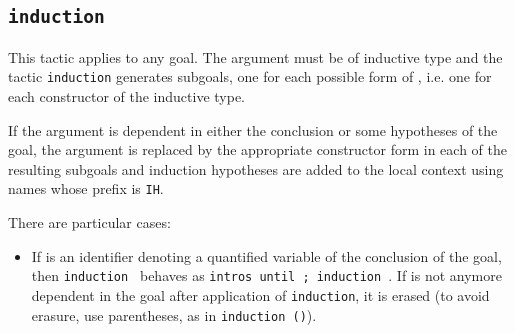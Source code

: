 \begin{coq_example*}

\subsection{\tt induction \term}
\label{Tac-induction}

This tactic applies to any goal. The argument {\term} must be of
inductive type and the tactic {\tt induction} generates subgoals,
one for each possible form of {\term}, i.e. one for each constructor
of the inductive type.

If the argument is dependent in either the conclusion or some
hypotheses of the goal, the argument is replaced by the appropriate
constructor form in each of the resulting subgoals and induction
hypotheses are added to the local context using names whose prefix is
{\tt IH}.

There are particular cases:

\begin{itemize}

\item If {\term} is an identifier {\ident} denoting a quantified
  variable of the conclusion of the goal, then {\tt induction
    {\ident}} behaves as {\tt intros until {\ident}; induction
    {\ident}}.  If {\ident} is not anymore dependent in the goal
  after application of {\tt induction}, it is erased (to avoid
  erasure, use parentheses, as in {\tt induction ({\ident})}).


\end{itemize}
\end{coq_example*}
